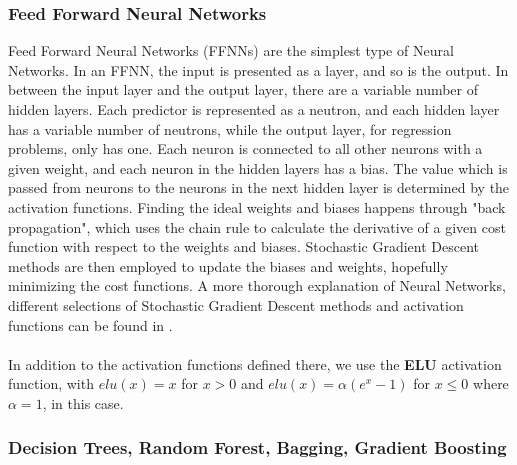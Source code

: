 \documentclass[11pt,a4paper,notitlepage]{article}
\begin{document}
\subsubsection{Feed Forward Neural Networks}
Feed Forward Neural Networks (FFNNs) are the simplest type of Neural Networks. In an FFNN, the input is presented as a layer, and so is the output. In between the input layer and the output layer, there are a variable number of hidden layers. Each predictor is represented as a neutron, and each hidden layer has a variable number of neutrons, while the output layer, for regression problems, only has one. Each neuron is connected to all other neurons with a given weight, and each neuron in the hidden layers has a bias. The value which is passed from neurons to the neurons in the next hidden layer is determined by the activation functions. Finding the ideal weights and biases happens through "back propagation", which uses the chain rule to calculate the derivative of a given cost function with respect to the weights and biases. Stochastic Gradient Descent methods are then employed to update the biases and weights, hopefully minimizing the cost functions. A more thorough explanation of Neural Networks, different selections of Stochastic Gradient Descent methods and activation functions can be found in \citep{Project2}.\\\\ In addition to the activation functions defined there, we use the \textbf{ELU} activation function, with $elu(x)=x$ for $x>0$ and  $elu(x)=\alpha (e^x - 1)$ for $x\leq 0$ where $\alpha=1$, in this case.
\subsubsection{Decision Trees, Random Forest, Bagging, Gradient Boosting}
\end{document}

